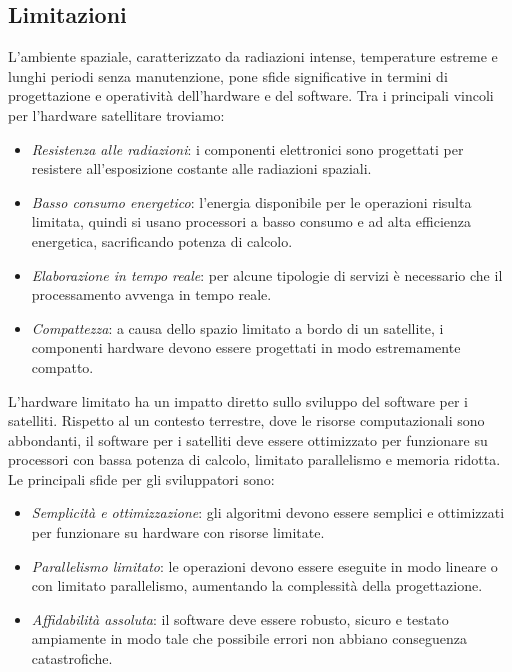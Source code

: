 \subsection{Limitazioni}

L'ambiente spaziale, caratterizzato da radiazioni intense, temperature estreme e lunghi periodi senza manutenzione, pone sfide significative in termini di progettazione e operatività dell'hardware e del software.
Tra i principali vincoli per l'hardware satellitare troviamo:

\begin{itemize}
    \item \textit{Resistenza alle radiazioni}: i componenti elettronici sono progettati per resistere all'esposizione costante alle radiazioni spaziali.
    \item \textit{Basso consumo energetico}: l'energia disponibile per le operazioni risulta limitata, quindi si usano processori a basso consumo e ad alta efficienza energetica, sacrificando potenza di calcolo.
    \item \textit{Elaborazione in tempo reale}: per alcune tipologie di servizi è necessario che il processamento avvenga in tempo reale.
    \item \textit{Compattezza}: a causa dello spazio limitato a bordo di un satellite, i componenti hardware devono essere progettati in modo estremamente compatto.
\end{itemize}

\noindent
L'hardware limitato ha un impatto diretto sullo sviluppo del software per i satelliti. 
Rispetto al un contesto terrestre, dove le risorse computazionali sono abbondanti, il software per i satelliti deve essere ottimizzato per funzionare su processori con bassa potenza di calcolo, limitato parallelismo e memoria ridotta. 
Le principali sfide per gli sviluppatori sono:

\begin{itemize}
    \item \textit{Semplicità e ottimizzazione}: gli algoritmi devono essere semplici e ottimiz\-zati per funzionare su hardware con risorse limitate.
    \item \textit{Parallelismo limitato}: le operazioni devono essere eseguite in modo lineare o con limitato parallelismo, aumentando la complessità della progettazione.
    \item \textit{Affidabilità assoluta}: il software deve essere robusto, sicuro e testato ampiamente in modo tale che possibile errori non abbiano conseguenza catastrofiche.
\end{itemize}

